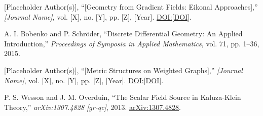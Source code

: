 \documentclass[twoside,twocolumn]{article}
\begin{document}
\begin{thebibliography}{10}
[Placeholder Author(s)],
``[Geometry from Gradient Fields: Eikonal Approaches],''
\textit{[Journal Name]}, vol. [X], no. [Y], pp. [Z], [Year].
\href{https://doi.org/[DOI]}{DOI:[DOI]}.

A. I. Bobenko and P. Schröder,
``Discrete Differential Geometry: An Applied Introduction,''
\textit{Proceedings of Symposia in Applied Mathematics}, vol. 71, pp. 1--36, 2015.

[Placeholder Author(s)],
``[Metric Structures on Weighted Graphs],''
\textit{[Journal Name]}, vol. [X], no. [Y], pp. [Z], [Year].
\href{https://doi.org/[DOI]}{DOI:[DOI]}.

P. S. Wesson and J. M. Overduin,
``The Scalar Field Source in Kaluza-Klein Theory,''
\textit{arXiv:1307.4828 [gr-qc]}, 2013.
\href{https://arxiv.org/abs/1307.4828}{arXiv:1307.4828}.

\end{thebibliography}
\end{document}

